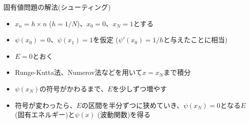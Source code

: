\begin{frame}[t,fragile]{固有値問題の解法(シューティング)}
  \begin{itemize}
  \item $x_n=h \times n$ ($h=1/N$)、$x_0=0$、$x_N=1$とする
  \item $\psi(x_0)=0$、$\psi(x_1) = 1$を仮定 ($\psi'(x_0)=1/h$と与えたことに相当)
  \item $E = 0$とおく
  \item Runge-Kutta法、Numerov法などを用いて$x=x_N$まで積分
  \item $\psi(x_N)$の符号がかわるまで、$E$を少しずつ増やす
  \item 符号が変わったら、$E$の区間を半分ずつに狭めていき、$\psi(x_N)=0$となる$E$ (固有エネルギー)と$\psi(x)$ (波動関数)を得る
  \end{itemize}
\end{frame}
